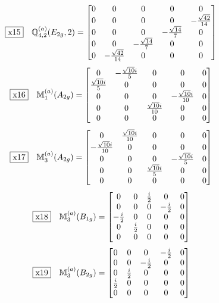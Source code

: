 \documentclass[fleqn,10pt,landscape]{jsarticle}
\begin{document}
\begin{dmath*}
\fbox{x15}\quad \mathbb{Q}_{4,2}^{(a)}(E_{2g},2)=\begin{bmatrix} 0 & 0 & 0 & 0 & 0 \\ 0 & 0 & 0 & 0 & - \frac{\sqrt{42}}{14} \\ 0 & 0 & 0 & - \frac{\sqrt{14}}{7} & 0 \\ 0 & 0 & - \frac{\sqrt{14}}{7} & 0 & 0 \\ 0 & - \frac{\sqrt{42}}{14} & 0 & 0 & 0 \end{bmatrix}
\end{dmath*}
\begin{dmath*}
\fbox{x16}\quad \mathbb{M}_{1}^{(a)}(A_{2g})=\begin{bmatrix} 0 & - \frac{\sqrt{10} i}{5} & 0 & 0 & 0 \\ \frac{\sqrt{10} i}{5} & 0 & 0 & 0 & 0 \\ 0 & 0 & 0 & - \frac{\sqrt{10} i}{10} & 0 \\ 0 & 0 & \frac{\sqrt{10} i}{10} & 0 & 0 \\ 0 & 0 & 0 & 0 & 0 \end{bmatrix}
\end{dmath*}
\begin{dmath*}
\fbox{x17}\quad \mathbb{M}_{3}^{(a)}(A_{2g})=\begin{bmatrix} 0 & \frac{\sqrt{10} i}{10} & 0 & 0 & 0 \\ - \frac{\sqrt{10} i}{10} & 0 & 0 & 0 & 0 \\ 0 & 0 & 0 & - \frac{\sqrt{10} i}{5} & 0 \\ 0 & 0 & \frac{\sqrt{10} i}{5} & 0 & 0 \\ 0 & 0 & 0 & 0 & 0 \end{bmatrix}
\end{dmath*}
\begin{dmath*}
\fbox{x18}\quad \mathbb{M}_{3}^{(a)}(B_{1g})=\begin{bmatrix} 0 & 0 & \frac{i}{2} & 0 & 0 \\ 0 & 0 & 0 & - \frac{i}{2} & 0 \\ - \frac{i}{2} & 0 & 0 & 0 & 0 \\ 0 & \frac{i}{2} & 0 & 0 & 0 \\ 0 & 0 & 0 & 0 & 0 \end{bmatrix}
\end{dmath*}
\begin{dmath*}
\fbox{x19}\quad \mathbb{M}_{3}^{(a)}(B_{2g})=\begin{bmatrix} 0 & 0 & 0 & - \frac{i}{2} & 0 \\ 0 & 0 & - \frac{i}{2} & 0 & 0 \\ 0 & \frac{i}{2} & 0 & 0 & 0 \\ \frac{i}{2} & 0 & 0 & 0 & 0 \\ 0 & 0 & 0 & 0 & 0 \end{bmatrix}
\end{dmath*}
\end{document}
